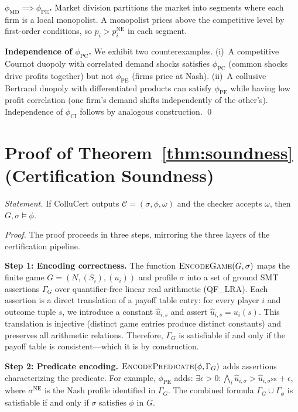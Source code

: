 \documentclass[11pt]{article}
\begin{document}
\medskip\noindent\textbf{$\phi_{\text{MD}} \implies \phi_{\text{PE}}$.}
Market division partitions the market into segments where each firm is a local monopolist. A monopolist prices above the competitive level by first-order conditions, so $p_i > p_i^{\text{NE}}$ in each segment.

\medskip\noindent\textbf{Independence of $\phi_{\text{PC}}$.}
We exhibit two counterexamples. (i)~A competitive Cournot duopoly with correlated demand shocks satisfies $\phi_{\text{PC}}$ (common shocks drive profits together) but not $\phi_{\text{PE}}$ (firms price at Nash). (ii)~A collusive Bertrand duopoly with differentiated products can satisfy $\phi_{\text{PE}}$ while having low profit correlation (one firm's demand shifts independently of the other's). Independence of $\phi_{\text{CI}}$ follows by analogous construction. \qed

\section{Proof of Theorem~\ref{thm:soundness} (Certification Soundness)}

\noindent\textit{Statement.} If ColluCert outputs $\mathcal{C} = (\sigma, \phi, \omega)$ and the checker accepts $\omega$, then $G, \sigma \models \phi$.

\medskip\noindent\textit{Proof.}
The proof proceeds in three steps, mirroring the three layers of the certification pipeline.

\medskip\noindent\textbf{Step 1: Encoding correctness.}
The function $\textsc{EncodeGame}(G, \sigma)$ maps the finite game $G = (N, (S_i), (u_i))$ and profile $\sigma$ into a set of ground SMT assertions $\Gamma_G$ over quantifier-free linear real arithmetic (QF\_LRA). Each assertion is a direct translation of a payoff table entry: for every player $i$ and outcome tuple $s$, we introduce a constant $\hat{u}_{i,s}$ and assert $\hat{u}_{i,s} = u_i(s)$. This translation is injective (distinct game entries produce distinct constants) and preserves all arithmetic relations. Therefore, $\Gamma_G$ is satisfiable if and only if the payoff table is consistent---which it is by construction.

\medskip\noindent\textbf{Step 2: Predicate encoding.}
$\textsc{EncodePredicate}(\phi, \Gamma_G)$ adds assertions characterizing the predicate. For example, $\phi_{\text{PE}}$ adds: $\exists \epsilon > 0\!: \bigwedge_i \hat{u}_{i,\sigma} > \hat{u}_{i,\sigma^{\text{NE}}} + \epsilon$, where $\sigma^{\text{NE}}$ is the Nash profile identified in $\Gamma_G$. The combined formula $\Gamma_G \cup \Gamma_\phi$ is satisfiable if and only if $\sigma$ satisfies $\phi$ in $G$.
\end{document}
